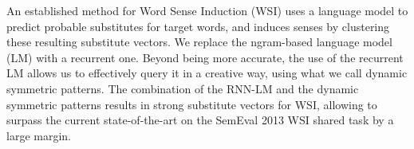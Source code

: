 An established method for Word Sense Induction (WSI) uses a language model to predict probable substitutes for target words, and induces senses by clustering these resulting substitute vectors. We replace the ngram-based language model (LM) with a recurrent one. Beyond being more accurate, the use of the recurrent LM allows us to effectively query it in a creative way, using what we call dynamic symmetric patterns. The combination of the RNN-LM and the dynamic symmetric patterns results in strong substitute vectors for WSI, allowing to surpass the current state-of-the-art on the SemEval 2013 WSI shared task by a large margin.

